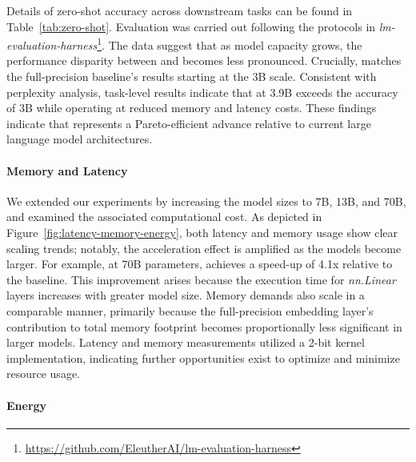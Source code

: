Details of zero-shot accuracy across downstream tasks can be found in Table~\ref{tab:zero-shot}. Evaluation was carried out following the protocols in \emph{lm-evaluation-harness}\footnote{\url{https://github.com/EleutherAI/lm-evaluation-harness}}. The data suggest that as model capacity grows, the performance disparity between  and  becomes less pronounced. Crucially,  matches the full-precision baseline’s results starting at the 3B scale. Consistent with perplexity analysis, task-level results indicate that  at 3.9B exceeds the accuracy of  3B while operating at reduced memory and latency costs. These findings indicate that  represents a Pareto-efficient advance relative to current large language model architectures.

\paragraph{Memory and Latency}

We extended our experiments by increasing the model sizes to 7B, 13B, and 70B, and examined the associated computational cost. As depicted in Figure~\ref{fig:latency-memory-energy}, both latency and memory usage show clear scaling trends; notably, the acceleration effect is amplified as the models become larger. For example, at 70B parameters,  achieves a speed-up of 4.1x relative to the  baseline. This improvement arises because the execution time for \emph{nn.Linear} layers increases with greater model size. Memory demands also scale in a comparable manner, primarily because the full-precision embedding layer's contribution to total memory footprint becomes proportionally less significant in larger models. Latency and memory measurements utilized a 2-bit kernel implementation, indicating further opportunities exist to optimize and minimize resource usage.

\paragraph{Energy}

